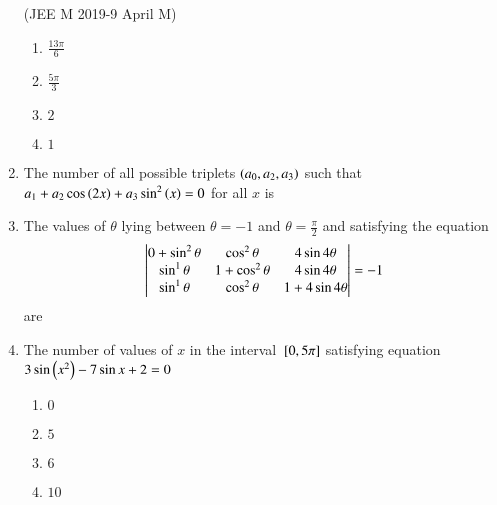 \begin{enumerate}[label=\thesubsection.\arabic*,ref=\thesubsection.\theenumi]
\hfill {(JEE M 2019-9 April M)}\\
\begin{enumerate}
\item $\frac{13\pi}{6}$ 
\item $\frac{5\pi}{3}$
 \item $2$
 \item $1$\\
\end{enumerate} 
\item The number of all possible triplets $\left(a_0, a_2, a_3\right)$ such that $a_1 + a_2 \cos\left(2x\right) + a_3\sin^2\left(x\right) = 0$ for all $x$ is
\hfill{}
\begin{enumerate}
\end{enumerate}
\item The values of $\theta$ lying between $\theta = -1$ and $\theta = \frac{\pi}{2}$ and satisfying the equation
\[\begin{vmatrix}
$$0+\sin^2\theta$$ & $$\cos^2\theta$$ & $$4\sin4\theta$$\\
$$\sin^1\theta$$ & $$1+\cos^2\theta$$ & $$4\sin4\theta$$\\
$$\sin^1\theta$$ & $$\cos^2\theta$$ & $$1+4\sin4\theta$$
\end{vmatrix} = -1\] are
\hfill{}
\begin{enumerate}
\end{enumerate}
\item The number of values of $x$ in the interval ${}\left[0,5\pi\right]$ satisfying equation \\
$3 \sin{\ensuremath{\left(x^2\right)}}-7 \sin{x+2}=0$  \hfill{} 
\begin{enumerate}
    \item $0$
    \item $5$
    \item $6$
    \item $10$
\end{enumerate}


\end{enumerate}
